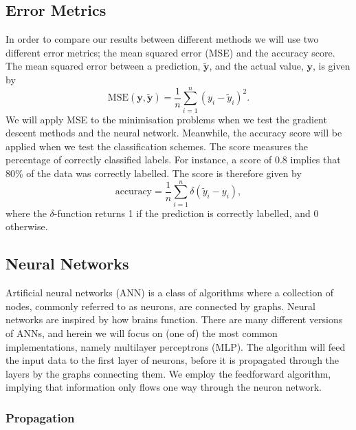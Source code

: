 \documentclass[a4paper, 
amsfonts, 
amssymb, 
amsmath, 
reprint, 
showkeys, 
nofootinbib, 
twoside]{revtex4-2}
\begin{document}
\subsection{Error Metrics}

In order to compare our results between different methods we will use two different error metrics; the mean squared error (MSE) and the accuracy score. 
The mean squared error between a prediction, $\mathbf{\tilde{y}}$, and the actual value, $\mathbf{y}$, is given by
\begin{equation}
    \textrm{MSE}(\bm{y}, \bm{\tilde{y}}) = \frac{1}{n}\sum_{i = 1}^n (y_i - \tilde{y}_i)^2.
\end{equation}
We will apply MSE to the minimisation problems when we test the gradient descent methods and the neural network.
Meanwhile, the accuracy score will be applied when we test the classification schemes. The score measures the percentage of correctly classified labels. For instance, a score of $0.8$ implies that 80\% of the data was correctly labelled. The score is therefore given by
\begin{equation}
    \textrm{accuracy} = \frac{1}{n}\sum_{i = 1}^n \delta(\tilde{y}_i - y_i),
\end{equation}
where the $\delta$-function returns 1 if the prediction is correctly labelled, and 0 otherwise.




\subsection{Neural Networks}

Artificial neural networks (ANN) is a class of algorithms where a collection of nodes, commonly referred to as neurons, are connected by graphs. Neural networks are inspired by how brains function. There are many different versions of ANNs, and herein we will focus on (one of) the most common implementations, namely multilayer perceptrons (MLP). The algorithm will feed the input data to the first layer of neurons, before it is propagated through the layers by the graphs connecting them. We employ the feedforward algorithm, implying that information only flows one way through the neuron network.  

\subsubsection{Propagation}
\end{document}
